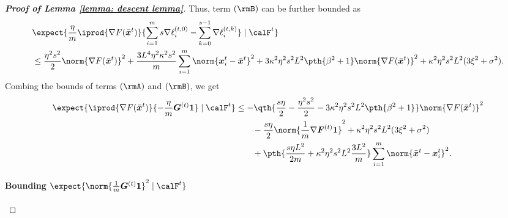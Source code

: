 \documentclass[letterpaper, 10 pt, conference]{ieeeconf}  %
\newcommand{\x}{{\bm x}}
\begin{document}
\begin{proof}[\bf Proof of Lemma \ref{lemma: descent lemma}]
Thus, term $(\rmB)$ can be further bounded as 
\begin{align*}
&\expect{\frac{\eta}{m} \iprod{\nabla F(\bar{\x}^{t})}{\sum_{i=1}^m s \nabla \ell_i^{(t,0)} - \sum_{k=0}^{s-1} \nabla \ell_i^{(t,k)}} \mid \calF^{t}} \\
& \le \frac{\eta^2 s^2}{2} \norm{\nabla F(\bar{\x}^{t})}^2 + \frac{3L^4 \eta^2 \kappa^2 s^2 }{m} \sum_{i=1}^m \norm{\x_i^t - \bar{\x}^t}^2 + 3\kappa^2 \eta^2 s^2 L^2\pth{\beta^2 + 1}\norm{\nabla F(\bar{\x}^t)}^2 + \kappa^2 \eta^2 s^2 L^2 (3\xi^2 +\sigma^2). 
\end{align*}
Combing the bounds of terms $(\rmA)$ and $(\rmB)$, we get 
\begin{align}
\label{eq: bound 1}
\nonumber
\expect{\iprod{\nabla F(\bar{\x}^{t})}{- \frac{\eta}{m} \bm{G}^{(t)} \bm{1}} \mid \calF^{t}} 
&\le  - \qth{\frac{s\eta}{2} - \frac{\eta^2 s^2}{2} - 3\kappa^2 \eta^2 s^2 L^2\pth{\beta^2 + 1}} \norm{\nabla F(\bar{\x}^t)}^2\\
\nonumber
& \qquad - \frac{s\eta}{2} \norm{\frac{1}{m}\nabla \bm{F}^{(t)}\bm{1}}^2 + \kappa^2 \eta^2 s^2 L^2 (3\xi^2 +\sigma^2)\\
& \qquad + \pth{\frac{s\eta L^2 }{2m} + \kappa^2 \eta^2 s^2 L^2 \frac{3L^2}{m}} \sum_{i=1}^m \norm{\bar{\x}^{t} - \x_i^t}^2. 
\end{align}
\paragraph{Bounding $\expect{\norm{\frac{1}{m} \bm{G}^{(t)} \bm{1}}^2 \mid \calF^{t}}$}


\end{proof}
\end{document}
